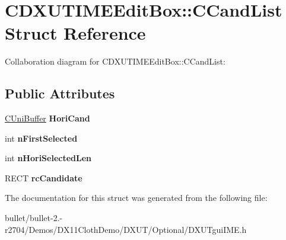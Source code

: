 \hypertarget{struct_c_d_x_u_t_i_m_e_edit_box_1_1_c_cand_list}{\section{C\+D\+X\+U\+T\+I\+M\+E\+Edit\+Box\+:\+:C\+Cand\+List Struct Reference}
\label{struct_c_d_x_u_t_i_m_e_edit_box_1_1_c_cand_list}
}


Collaboration diagram for C\+D\+X\+U\+T\+I\+M\+E\+Edit\+Box\+:\+:C\+Cand\+List\+:
\subsection*{Public Attributes}
\begin{DoxyCompactItemize}
\item 
\hypertarget{struct_c_d_x_u_t_i_m_e_edit_box_1_1_c_cand_list_a7f1f8a0bfae767482eff260ad18702a7}{\hyperlink{class_c_uni_buffer}{C\+Uni\+Buffer} {\bfseries Hori\+Cand}}\label{struct_c_d_x_u_t_i_m_e_edit_box_1_1_c_cand_list_a7f1f8a0bfae767482eff260ad18702a7}

\item 
\hypertarget{struct_c_d_x_u_t_i_m_e_edit_box_1_1_c_cand_list_ae823d620ceb0fb648c83435135b01641}{int {\bfseries n\+First\+Selected}}\label{struct_c_d_x_u_t_i_m_e_edit_box_1_1_c_cand_list_ae823d620ceb0fb648c83435135b01641}

\item 
\hypertarget{struct_c_d_x_u_t_i_m_e_edit_box_1_1_c_cand_list_a64a1f4e408499157b031083bdd487aff}{int {\bfseries n\+Hori\+Selected\+Len}}\label{struct_c_d_x_u_t_i_m_e_edit_box_1_1_c_cand_list_a64a1f4e408499157b031083bdd487aff}

\item 
\hypertarget{struct_c_d_x_u_t_i_m_e_edit_box_1_1_c_cand_list_a1156d0c172cab967842783b7a33f7d63}{R\+E\+C\+T {\bfseries rc\+Candidate}}\label{struct_c_d_x_u_t_i_m_e_edit_box_1_1_c_cand_list_a1156d0c172cab967842783b7a33f7d63}

\end{DoxyCompactItemize}


The documentation for this struct was generated from the following file\+:\begin{DoxyCompactItemize}
\item 
bullet/bullet-\/2.-\/r2704/\+Demos/\+D\+X11\+Cloth\+Demo/\+D\+X\+U\+T/\+Optional/D\+X\+U\+Tgui\+I\+M\+E.\+h\end{DoxyCompactItemize}
